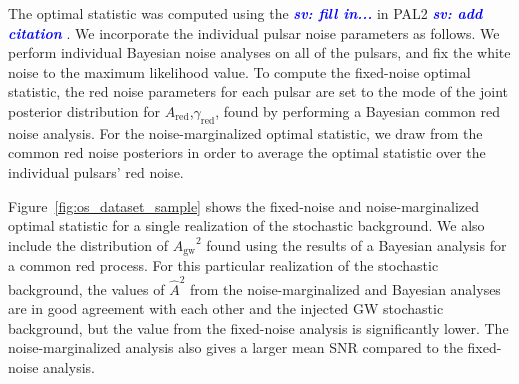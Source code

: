 \documentclass[twocolumn,aps,prd,superscriptaddress]{revtex4-1}
\newcommand{\sv}[1]{\textcolor{blue}{\it{\textbf{sv: #1}}} }
\newcommand{\Agw}{\ensuremath{A_\mathrm{gw}}}
\begin{document}
The optimal statistic was computed using the \sv{fill in...} in PAL2 \sv{add citation}. 
We incorporate the individual pulsar noise parameters as follows. 
We perform individual Bayesian noise analyses on all of the pulsars, and 
fix the white noise to the maximum likelihood value. 
To compute the fixed-noise optimal statistic, 
the red noise parameters for each pulsar are set to the mode of 
the joint posterior distribution for $A_\mathrm{red}$,$\gamma_\mathrm{red}$, 
found by performing a Bayesian common red noise analysis. 
For the noise-marginalized optimal statistic, we draw from 
the common red noise posteriors in order to average the optimal statistic over 
the individual pulsars' red noise.

Figure~\ref{fig:os_dataset_sample} shows the fixed-noise and noise-marginalized 
optimal statistic for a single realization of the stochastic background. 
We also include the distribution of $\Agw^2$ found using the results of a Bayesian analysis 
for a common red process. For this particular realization of the stochastic background, 
the values of $\hat{A}^2$ from the noise-marginalized and Bayesian analyses are in good agreement 
with each other and the injected GW stochastic background, 
but the value from the fixed-noise analysis is significantly lower. 
The noise-marginalized analysis also gives a larger mean SNR compared to the fixed-noise analysis.
\end{document}
